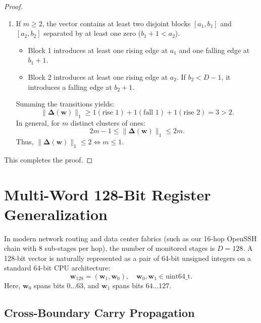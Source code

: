 \documentclass[11pt,a4paper]{article}
\theoremstyle{definition}
\begin{document}
\begin{proof}
\begin{enumerate}
    \item If $m \ge 2$, the vector contains at least two disjoint blocks $[a_1, b_1]$ and $[a_2, b_2]$ separated by at least one zero ($b_1 + 1 < a_2$). 
    \begin{itemize}
        \item Block 1 introduces at least one rising edge at $a_1$ and one falling edge at $b_1 + 1$.
        \item Block 2 introduces at least one rising edge at $a_2$. If $b_2 < D-1$, it introduces a falling edge at $b_2 + 1$.
    \end{itemize}
    Summing the transitions yields:
    \begin{equation}
        \|\bm{\Delta}(\mathbf{w})\|_1 \ge 1 (\text{rise } 1) + 1 (\text{fall } 1) + 1 (\text{rise } 2) = 3 > 2.
    \end{equation}
    In general, for $m$ distinct clusters of ones:
    \begin{equation}
        2m - 1 \le \|\bm{\Delta}(\mathbf{w})\|_1 \le 2m.
    \end{equation}
    Thus, $\|\bm{\Delta}(\mathbf{w})\|_1 \le 2 \iff m \le 1$.
\end{enumerate}
This completes the proof.
\end{proof}

\section{Multi-Word 128-Bit Register Generalization}

In modern network routing and data center fabrics (such as our 16-hop OpenSSH chain with 8 sub-stages per hop), the number of monitored stages is $D = 128$. A 128-bit vector is naturally represented as a pair of 64-bit unsigned integers on a standard 64-bit CPU architecture:
\begin{equation}
    \mathbf{w}_{128} = (\mathbf{w}_1, \mathbf{w}_0), \quad \mathbf{w}_0, \mathbf{w}_1 \in \text{uint64\_t}.
\end{equation}
Here, $\mathbf{w}_0$ spans bits $0 \dots 63$, and $\mathbf{w}_1$ spans bits $64 \dots 127$.

\subsection{Cross-Boundary Carry Propagation}
\end{document}
